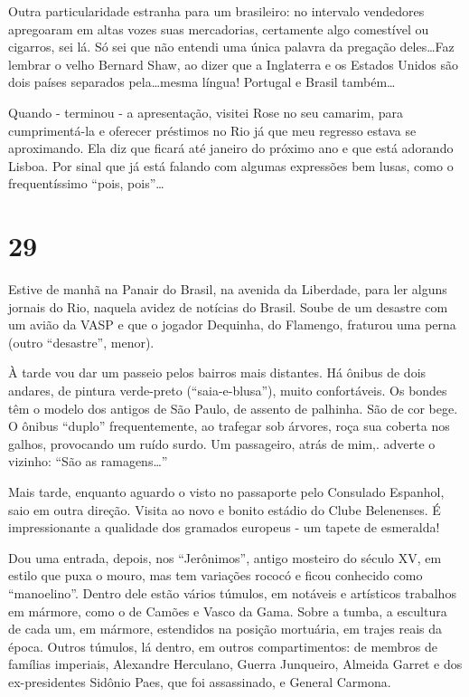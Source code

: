 Outra particularidade estranha para um brasileiro: no intervalo vendedores apregoaram em altas vozes suas mercadorias, certamente algo comestível ou cigarros, sei lá. Só sei que não entendi uma única palavra da pregação deles\ldots Faz lembrar o velho Bernard Shaw, ao dizer que a Inglaterra e os Estados Unidos são dois países separados pela\ldots mesma língua! Portugal e Brasil também\ldots

Quando - terminou - a apresentação, visitei Rose no seu camarim, para cumprimentá-la e oferecer préstimos no Rio já que meu regresso estava se aproximando. Ela diz que ficará até janeiro do próximo ano e que está adorando Lisboa. Por sinal que já está falando com algumas expressões bem lusas, como o frequentíssimo “pois, pois”\ldots

\section*{29 \adfflatleafright {}}
Estive de manhã na Panair do Brasil, na avenida da Liberdade, para ler alguns jornais do Rio, naquela avidez de notícias do Brasil. Soube de um desastre com um avião da VASP e que o jogador Dequinha, do Flamengo, fraturou uma perna (outro “desastre”, menor).

À tarde vou dar um passeio pelos bairros mais distantes. Há ônibus de dois andares, de pintura verde-preto (“saia-e-blusa”), muito confortáveis. Os bondes têm o modelo dos antigos de São Paulo, de assento de palhinha. São de cor bege. O ônibus “duplo” frequentemente, ao trafegar sob árvores, roça sua coberta nos galhos, provocando um ruído surdo. Um passageiro, atrás de mim,. adverte o vizinho: “São as ramagens\ldots”

Mais tarde, enquanto aguardo o visto no passaporte pelo Consulado Espanhol, saio em outra direção. Visita ao novo e bonito estádio do Clube Belenenses. É impressionante a qualidade dos gramados europeus - um tapete de esmeralda!

Dou uma entrada, depois, nos “Jerônimos”, antigo mosteiro do século XV, em estilo que puxa o mouro, mas tem variações rococó e ficou conhecido como “manoelino”. Dentro dele estão vários túmulos, em notáveis e artísticos trabalhos em mármore, como o de Camões e Vasco da Gama. Sobre a tumba, a escultura de cada um, em mármore, estendidos na posição mortuária, em trajes reais da época. Outros túmulos, lá dentro, em outros compartimentos: de membros de famílias imperiais, Alexandre Herculano, Guerra Junqueiro, Almeida Garret e dos ex-presidentes Sidônio Paes, que foi assassinado, e General Carmona.

